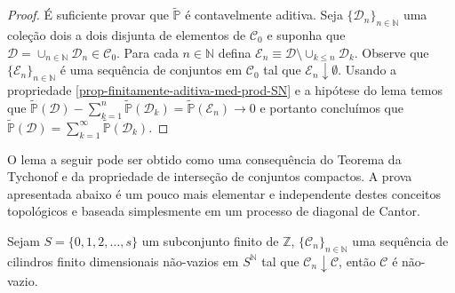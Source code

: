 \begin{proof}
É suficiente provar que 
$\widetilde{\mathbb{P}}$ é contavelmente aditiva.
Seja $\{\mathcal{D}_n\}_{n\in\mathbb{N}}$
uma coleção dois a dois disjunta de elementos 
de $\mathscr{C}_0$ 
e suponha que 
$\mathcal{D}=\cup_{n\in\mathbb{N}}\mathcal{D}_n\in\mathscr{C}_0$.
Para cada $n\in\mathbb{N}$ defina  
$\mathcal{E}_n\equiv \mathcal{D}\setminus \cup_{k\leq n}\mathcal{D}_k$.
Observe que $\{\mathcal{E}_n\}_{n\in\mathbb{N}}$ é uma sequência de 
conjuntos em $\mathscr{C}_0$ tal que $\mathcal{E}_n\downarrow \emptyset$.
Usando a propriedade \eqref{prop-finitamente-aditiva-med-prod-SN}
e a hipótese do lema temos que 
$
\widetilde{\mathbb{P}}(\mathcal{D})
- 
\sum_{k=1}^n\widetilde{\mathbb{P}}(\mathcal{D}_k)
=
\widetilde{\mathbb{P}}(\mathcal{E}_n)
\to 0
$ 
e portanto concluímos que 
$
\widetilde{\mathbb{P}}(\mathcal{D})
=
\sum_{k=1}^{\infty}\widetilde{\mathbb{P}}(\mathcal{D}_k).
$
\end{proof}




O lema a seguir pode ser obtido como uma consequência 
do Teorema da Tychonof e da propriedade de interseção 
de conjuntos compactos. A prova apresentada abaixo é
um pouco mais elementar e independente destes conceitos 
topológicos e baseada simplesmente em um processo 
de diagonal de Cantor.

\begin{lema}\label{lema-seq-encaixada-cilin-nao-vazios}
Sejam $S=\{0,1,2,\ldots,s\}$ um subconjunto finito de $\mathbb{Z}$,  
$\{\mathcal{C}_n\}_{n\in\mathbb{N}}$ uma sequência 
de cilindros finito dimensionais não-vazios em $S^{\mathbb{N}}$
tal que $\mathcal{C}_n\downarrow \mathcal{C}$, então 
$\mathcal{C}$ é não-vazio.
\end{lema}


